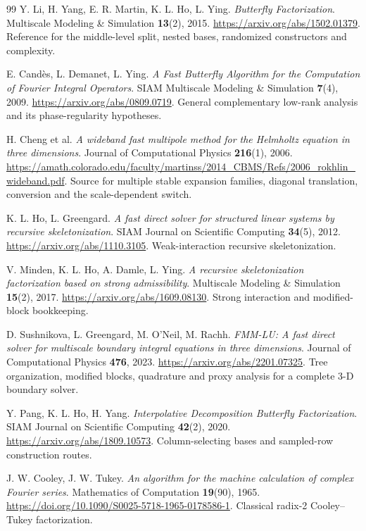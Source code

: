 \documentclass[11pt,a4paper]{article}
\begin{document}
\begin{thebibliography}{99}\small
{} Y. Li, H. Yang, E. R. Martin, K. L. Ho, L. Ying.
\emph{Butterfly Factorization}. Multiscale Modeling \& Simulation \textbf{13}(2), 2015.
\url{https://arxiv.org/abs/1502.01379}.
Reference for the middle-level split, nested bases, randomized constructors and complexity.

 E. Candès, L. Demanet, L. Ying.
\emph{A Fast Butterfly Algorithm for the Computation of Fourier Integral Operators}. SIAM Multiscale Modeling \& Simulation \textbf{7}(4), 2009.
\url{https://arxiv.org/abs/0809.0719}. General complementary low-rank analysis and its phase-regularity hypotheses.

 H. Cheng et al.
\emph{A wideband fast multipole method for the Helmholtz equation in three dimensions}. Journal of Computational Physics \textbf{216}(1), 2006.
\url{https://amath.colorado.edu/faculty/martinss/2014_CBMS/Refs/2006_rokhlin_wideband.pdf}.
Source for multiple stable expansion families, diagonal translation, conversion and the scale-dependent switch.

 K. L. Ho, L. Greengard.
\emph{A fast direct solver for structured linear systems by recursive skeletonization}. SIAM Journal on Scientific Computing \textbf{34}(5), 2012.
\url{https://arxiv.org/abs/1110.3105}. Weak-interaction recursive skeletonization.

 V. Minden, K. L. Ho, A. Damle, L. Ying.
\emph{A recursive skeletonization factorization based on strong admissibility}. Multiscale Modeling \& Simulation \textbf{15}(2), 2017.
\url{https://arxiv.org/abs/1609.08130}. Strong interaction and modified-block bookkeeping.

 D. Sushnikova, L. Greengard, M. O'Neil, M. Rachh.
\emph{FMM-LU: A fast direct solver for multiscale boundary integral equations in three dimensions}. Journal of Computational Physics \textbf{476}, 2023.
\url{https://arxiv.org/abs/2201.07325}. Tree organization, modified blocks, quadrature and proxy analysis for a complete 3-D boundary solver.

 Y. Pang, K. L. Ho, H. Yang.
\emph{Interpolative Decomposition Butterfly Factorization}. SIAM Journal on Scientific Computing \textbf{42}(2), 2020.
\url{https://arxiv.org/abs/1809.10573}. Column-selecting bases and sampled-row construction routes.

 J. W. Cooley, J. W. Tukey.
\emph{An algorithm for the machine calculation of complex Fourier series}. Mathematics of Computation \textbf{19}(90), 1965.
\url{https://doi.org/10.1090/S0025-5718-1965-0178586-1}. Classical radix-2 Cooley--Tukey factorization.


\end{thebibliography}
\end{document}
